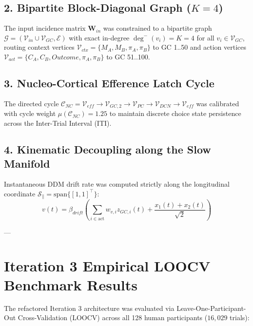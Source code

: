 \documentclass[11pt,a4paper]{article}
\begin{document}
\subsection{2. Bipartite Block-Diagonal Graph ($K=4$)}
The input incidence matrix $\mathbf{W}_{in}$ was constrained to a bipartite graph $\mathcal{G} = (\mathcal{V}_{in} \cup \mathcal{V}_{GC}, \mathcal{E})$ with exact in-degree $\deg^-(v_i) = K = 4$ for all $v_i \in \mathcal{V}_{GC}$, routing context vertices $\mathcal{V}_{ctx} = \{M_A, M_B, \pi_A, \pi_B\}$ to GC 1..50 and action vertices $\mathcal{V}_{act} = \{C_A, C_B, Outcome, \pi_A, \pi_B\}$ to GC 51..100.

\subsection{3. Nucleo-Cortical Efference Latch Cycle}
The directed cycle $\mathcal{C}_{NC} = \mathcal{V}_{eff} \to \mathcal{V}_{GC, 2} \to \mathcal{V}_{PC} \to \mathcal{V}_{DCN} \to \mathcal{V}_{eff}$ was calibrated with cycle weight $\mu(\mathcal{C}_{NC}) = 1.25$ to maintain discrete choice state persistence across the Inter-Trial Interval (ITI).

\subsection{4. Kinematic Decoupling along the Slow Manifold}
Instantaneous DDM drift rate was computed strictly along the longitudinal coordinate $\mathcal{S}_\parallel = \text{span}\{[1, 1]^\top\}$:
\begin{equation}
v(t) = \beta_{drift} \left( \sum_{i \in \text{act}} w_{v, i} z_{GC, i}(t) + \frac{x_1(t) + x_2(t)}{\sqrt{2}} \right)
\end{equation}

---

\section{Iteration 3 Empirical LOOCV Benchmark Results}

The refactored Iteration 3 architecture was evaluated via Leave-One-Participant-Out Cross-Validation (LOOCV) across all 128 human participants ($16,029$ trials):
\end{document}
